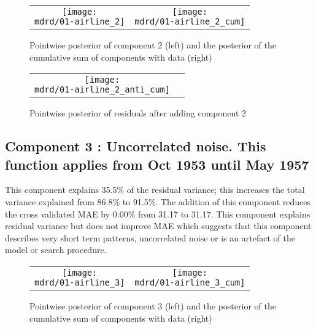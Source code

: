 \documentclass{article} %
\begin{document}
\begin{figure}[H]
\newcommand{\wmgd}{0.5\columnwidth}
\newcommand{\hmgd}{3.0cm}
\newcommand{\mdrd}{01-airline}
\newcommand{\mbm}{\hspace{-0.3cm}}
\begin{tabular}{cc}
\mbm \texttt{[image: \\mdrd/01-airline\_2]} & \texttt{[image: \\mdrd/01-airline\_2\_cum]}
\end{tabular}
\caption{Pointwise posterior of component 2 (left) and the posterior of the cumulative sum of components with data (right)}
\label{fig:comp2}
\end{figure}

\begin{figure}[H]
\newcommand{\wmgd}{0.5\columnwidth}
\newcommand{\hmgd}{3.0cm}
\newcommand{\mdrd}{01-airline}
\newcommand{\mbm}{\hspace{-0.3cm}}
\begin{tabular}{cc}
\mbm \texttt{[image: \\mdrd/01-airline\_2\_anti\_cum]}
\end{tabular}
\caption{Pointwise posterior of residuals after adding component 2}
\label{fig:comp2}
\end{figure}

\subsection{Component 3 : Uncorrelated noise. This function applies from Oct 1953 until May 1957}



This component explains 35.5\% of the residual variance; this increases the total variance explained from 86.8\% to 91.5\%.
The addition of this component reduces the cross validated MAE by 0.00\% from 31.17 to 31.17.
This component explains residual variance but does not improve MAE which suggests that this component describes very short term patterns, uncorrelated noise or is an artefact of the model or search procedure.

\begin{figure}[H]
\newcommand{\wmgd}{0.5\columnwidth}
\newcommand{\hmgd}{3.0cm}
\newcommand{\mdrd}{01-airline}
\newcommand{\mbm}{\hspace{-0.3cm}}
\begin{tabular}{cc}
\mbm \texttt{[image: \\mdrd/01-airline\_3]} & \texttt{[image: \\mdrd/01-airline\_3\_cum]}
\end{tabular}
\caption{Pointwise posterior of component 3 (left) and the posterior of the cumulative sum of components with data (right)}
\label{fig:comp3}
\end{figure}
\end{document}

